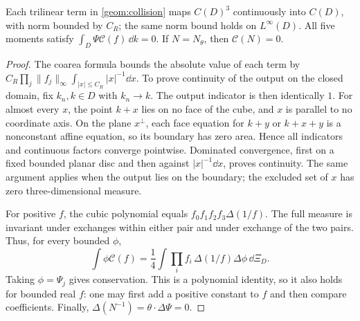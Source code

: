 \begin{lemma}\label{geom:basic}
Each trilinear term in \eqref{geom:collision} maps $C(D)^3$ continuously
into $C(D)$, with norm bounded by $C_R$; the same norm bound holds
on $L^\infty(D)$. All five moments satisfy
$\int_D\Psi\mathcal C(f)\,\dd k=0$.
If $N=N_\theta$, then $\mathcal C(N)=0$.
\end{lemma}
\begin{proof}
The coarea formula bounds the absolute value of each term by
$C_R\prod_j\|f_j\|_\infty\int_{|x|\le C_R}|x|^{-1}\dd x$.
To prove continuity of the output on the closed domain, fix $k_n,k\in D$
with $k_n\to k$. The output indicator is then identically $1$.
For almost every $x$, the point $k+x$ lies on no face of the cube,
and $x$ is parallel to no coordinate axis. On the plane $x^\perp$,
each face equation for $k+y$ or $k+x+y$ is a nonconstant affine equation,
so its boundary has zero area. Hence all indicators and continuous factors
converge pointwise. Dominated convergence, first on a fixed bounded planar
disc and then against $|x|^{-1}\dd x$, proves continuity.
The same argument applies when the output lies on the boundary; the excluded
set of $x$ has zero three-dimensional measure.

For positive $f$, the cubic polynomial equals
$f_0f_1f_2f_3\Delta(1/f)$. The full measure is invariant under exchanges
within either pair and under exchange of the two pairs. Thus, for every
bounded $\phi$,
\[
 \int\phi\mathcal C(f)=\frac14\int\prod_i f_i\,
                  \Delta(1/f)\Delta\phi\,\dd\Xi_D.
\]
Taking $\phi=\Psi_j$ gives conservation. This is a polynomial identity,
so it also holds for bounded real $f$: one may first add a positive constant
to $f$ and then compare coefficients. Finally,
$\Delta(N^{-1})=\theta\cdot\Delta\Psi=0$.
\end{proof}

